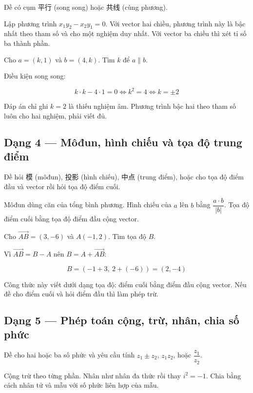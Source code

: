 \documentclass[11pt, a4paper]{article}
\begin{document}
 Đề có cụm 平行 (song song) hoặc 共线 (cùng phương).

 Lập phương trình $x_1y_2 - x_2y_1 = 0$. Với vector hai chiều, phương trình này là bậc nhất theo tham số và cho một nghiệm duy nhất. Với vector ba chiều thì xét tỉ số ba thành phần.

\begin{vidu}[{3}]
Cho $a = (k, 1)$ và $b = (4, k)$. Tìm $k$ để $a \parallel b$.

Điều kiện song song:

$$k \cdot k - 4 \cdot 1 = 0 \iff k^2 = 4 \iff k = \pm 2$$

 Đáp án chỉ ghi $k = 2$ là thiếu nghiệm âm. Phương trình bậc hai theo tham số luôn cho hai nghiệm, phải viết đủ.

\end{vidu}
\subsection{Dạng 4 — Môđun, hình chiếu và tọa độ trung điểm}

 Đề hỏi 模 (môđun), 投影 (hình chiếu), 中点 (trung điểm), hoặc cho tọa độ điểm đầu và vector rồi hỏi tọa độ điểm cuối.

 Môđun dùng căn của tổng bình phương. Hình chiếu của $a$ lên $b$ bằng $\dfrac{a \cdot b}{\lvert b \rvert}$. Tọa độ điểm cuối bằng tọa độ điểm đầu cộng vector.

\begin{vidu}[{4}]
Cho $\overrightarrow{AB} = (3, -6)$ và $A(-1, 2)$. Tìm tọa độ $B$.

Vì $\overrightarrow{AB} = B - A$ nên $B = A + \overrightarrow{AB}$:

$$B = (-1 + 3,\ 2 + (-6)) = (2, -4)$$

 Công thức này viết dưới dạng tọa độ: điểm cuối bằng điểm đầu cộng vector. Nếu đề cho điểm cuối và hỏi điểm đầu thì làm phép trừ.

\end{vidu}
\subsection{Dạng 5 — Phép toán cộng, trừ, nhân, chia số phức}

 Đề cho hai hoặc ba số phức và yêu cầu tính $z_1 \pm z_2$, $z_1 z_2$, hoặc $\dfrac{z_1}{z_2}$.

 Cộng trừ theo từng phần. Nhân như nhân đa thức rồi thay $i^2 = -1$. Chia bằng cách nhân tử và mẫu với số phức liên hợp của mẫu.
\end{document}
